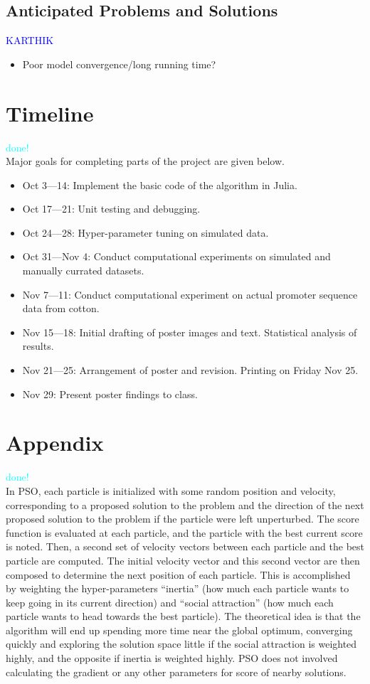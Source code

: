 \documentclass{article}
\begin{document}
\subsection{Anticipated Problems and Solutions}
\textcolor{blue}{KARTHIK} \\
\begin{itemize}
	\item Poor model convergence/long running time?
\end{itemize}
\section{Timeline}
\textcolor{cyan}{done!} \\
Major goals for completing parts of the project are given below.
\begin{itemize}
	\item Oct  3---14: Implement the basic code of the algorithm in Julia.
	\item Oct 17---21: Unit testing and debugging.
	\item Oct 24---28: Hyper-parameter tuning on simulated data.
	\item Oct 31---Nov 4: Conduct computational experiments on simulated and manually currated datasets.
	\item Nov 7---11: Conduct computational experiment on actual promoter sequence data from cotton.
	\item Nov 15---18: Initial drafting of poster images and text. Statistical analysis of results.
	\item Nov 21---25: Arrangement of poster and revision. Printing on Friday Nov 25.
	\item Nov 29: Present poster findings to class.
\end{itemize}
\pagebreak
\section{Appendix}
\textcolor{cyan}{done!} \\
In PSO, each particle is initialized with some random position and velocity, corresponding to a proposed solution to the problem and the direction of the next proposed solution to the problem if the particle were left unperturbed. The score function is evaluated at each particle, and the particle with the best current score is noted. Then, a second set of velocity vectors between each particle and the best particle are computed. The initial velocity vector and this second vector are then composed to determine the next position of each particle. This is accomplished by weighting the hyper-parameters ``inertia'' (how much each particle wants to keep going in its current direction) and ``social attraction'' (how much each particle wants to head towards the best particle). The theoretical idea is that the algorithm will end up spending more time near the global optimum, converging quickly and exploring the solution space little if the social attraction is weighted highly, and the opposite if inertia is weighted highly. PSO does not involved calculating the gradient or any other parameters for score of nearby solutions.
  
\end{document}
